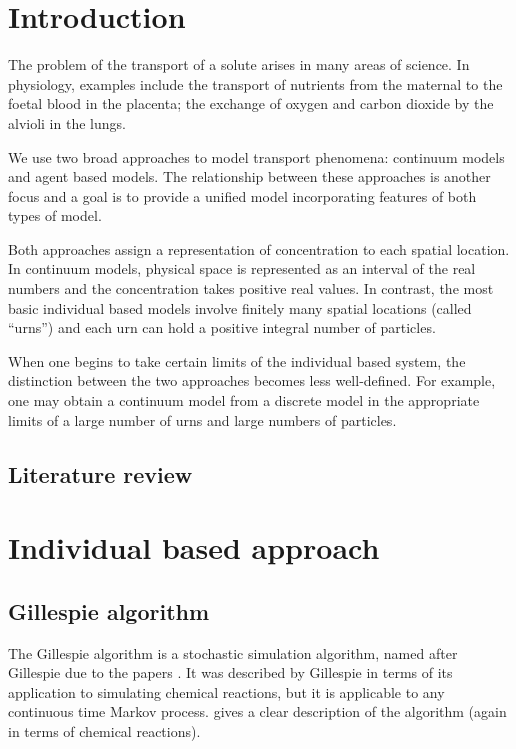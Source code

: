 \chapter{Introduction}
The problem of the transport of a solute arises in many areas of science. In
physiology, examples include the transport of nutrients from the maternal to the
foetal blood in the placenta; the exchange of oxygen and carbon dioxide by the
alvioli in the lungs. 

We use two broad approaches to model transport phenomena: continuum models and
agent based models. The relationship between these approaches is another focus
and a goal is to provide a unified model incorporating features of both types of
model.

Both approaches assign a representation of concentration to each
spatial location. In continuum models, physical space is represented as an
interval of the real numbers and the concentration takes positive real values.
In contrast, the most basic individual based models involve finitely many
spatial locations (called ``urns'') and each urn can hold a positive integral
number of particles.

When one begins to take certain limits of the individual based system, the
distinction between the two approaches becomes less well-defined. For example,
one may obtain a continuum model from a discrete model in the appropriate limits
of a large number of urns and large numbers of particles. 

\section{Literature review}

\chapter{Individual based approach}

\section{Gillespie algorithm}
The Gillespie algorithm is a stochastic simulation algorithm, named after
Gillespie due to the papers \cite{gillespie1976general,gillespie1977exact}. It
was described by Gillespie in terms of its application to simulating chemical
reactions, but it is applicable to any continuous time Markov process.
\cite{anderson2007modified} gives a clear description of the algorithm (again in
terms of chemical reactions).

